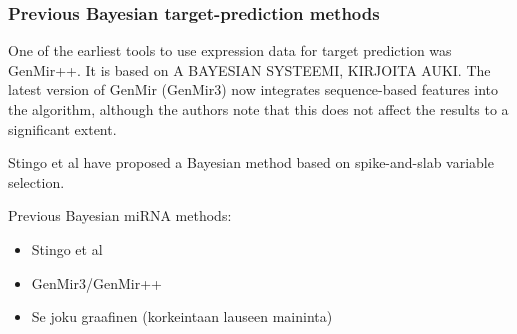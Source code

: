\subsubsection{Previous Bayesian target-prediction methods}


One of the earliest tools to use expression data for target prediction was
GenMir++. It is based on A BAYESIAN SYSTEEMI, KIRJOITA AUKI.
The latest version of GenMir (GenMir3) now integrates sequence-based features
into the algorithm, although the authors note that this does not affect the
results to a significant extent.

Stingo et al have proposed a Bayesian method based on spike-and-slab variable
selection.

Previous Bayesian miRNA methods:
\begin{itemize}
  \item Stingo et al
  \item GenMir3/GenMir++
  \item Se joku graafinen (korkeintaan lauseen maininta)
\end{itemize}



